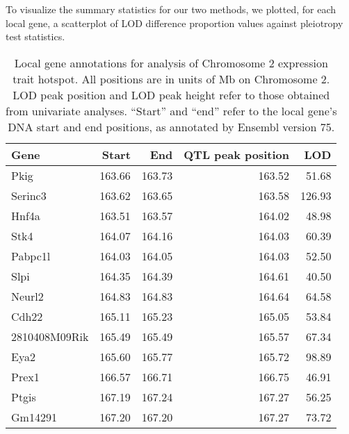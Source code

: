 \documentclass[oneside]{book}
\begin{document}

To visualize the summary statistics for our two methods, we plotted, for each local gene, a scatterplot of LOD difference proportion values against pleiotropy test statistics.

\begin{table}[ht]
\centering
\begin{tabular}{lrrrr}
  \hline
Gene & Start & End & QTL peak position & LOD\\
  \hline
Pkig & 163.66 & 163.73 & 163.52 & 51.68 \\
  Serinc3 & 163.62 & 163.65 & 163.58 & 126.93 \\
  Hnf4a & 163.51 & 163.57 & 164.02 & 48.98 \\
  Stk4 & 164.07 & 164.16 & 164.03 & 60.39 \\
  Pabpc1l & 164.03 & 164.05 & 164.03 & 52.50 \\
  Slpi & 164.35 & 164.39 & 164.61 & 40.50 \\
  Neurl2 & 164.83 & 164.83 & 164.64 & 64.58 \\
  Cdh22 & 165.11 & 165.23 & 165.05 & 53.84 \\
  2810408M09Rik & 165.49 & 165.49 & 165.57 & 67.34 \\
  Eya2 & 165.60 & 165.77 & 165.72 & 98.89 \\
  Prex1 & 166.57 & 166.71 & 166.75 & 46.91 \\
  Ptgis & 167.19 & 167.24 & 167.27 & 56.25 \\
  Gm14291 & 167.20 & 167.20 & 167.27 & 73.72 \\
   \hline
\end{tabular}
\caption{Local gene annotations for analysis of Chromosome 2 expression trait hotspot. All positions are in units of Mb on Chromosome 2. LOD peak position and LOD peak height refer to those obtained from univariate analyses. ``Start'' and ``end'' refer to the local gene's DNA start and end positions, as annotated by Ensembl version 75.}
\label{tab:annot}
\end{table}

\end{document}
